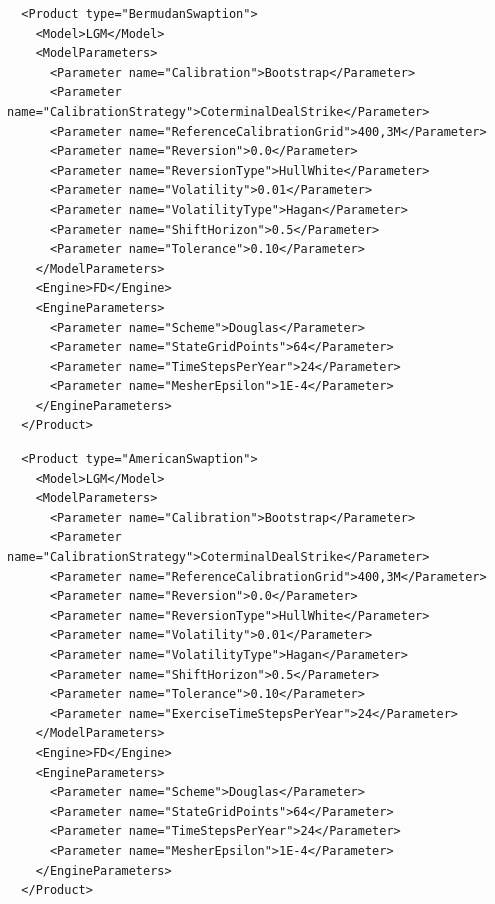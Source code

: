 \begin{listing}[h]
\begin{verbatim}
  <Product type="BermudanSwaption">
    <Model>LGM</Model>
    <ModelParameters>
      <Parameter name="Calibration">Bootstrap</Parameter>
      <Parameter name="CalibrationStrategy">CoterminalDealStrike</Parameter>
      <Parameter name="ReferenceCalibrationGrid">400,3M</Parameter>
      <Parameter name="Reversion">0.0</Parameter>
      <Parameter name="ReversionType">HullWhite</Parameter>
      <Parameter name="Volatility">0.01</Parameter>
      <Parameter name="VolatilityType">Hagan</Parameter>
      <Parameter name="ShiftHorizon">0.5</Parameter>
      <Parameter name="Tolerance">0.10</Parameter>
    </ModelParameters>
    <Engine>FD</Engine>
    <EngineParameters>
      <Parameter name="Scheme">Douglas</Parameter>
      <Parameter name="StateGridPoints">64</Parameter>
      <Parameter name="TimeStepsPerYear">24</Parameter>
      <Parameter name="MesherEpsilon">1E-4</Parameter>
    </EngineParameters>
  </Product>
\end{verbatim}
\caption{Bermudan Swaption pricing configuration FD Engine}
\label{lst:ir_bermswaption_pricing_config_fd}
\end{listing}

\begin{listing}[h]
\begin{verbatim}
  <Product type="AmericanSwaption">
    <Model>LGM</Model>
    <ModelParameters>
      <Parameter name="Calibration">Bootstrap</Parameter>
      <Parameter name="CalibrationStrategy">CoterminalDealStrike</Parameter>
      <Parameter name="ReferenceCalibrationGrid">400,3M</Parameter>
      <Parameter name="Reversion">0.0</Parameter>
      <Parameter name="ReversionType">HullWhite</Parameter>
      <Parameter name="Volatility">0.01</Parameter>
      <Parameter name="VolatilityType">Hagan</Parameter>
      <Parameter name="ShiftHorizon">0.5</Parameter>
      <Parameter name="Tolerance">0.10</Parameter>
      <Parameter name="ExerciseTimeStepsPerYear">24</Parameter>
    </ModelParameters>
    <Engine>FD</Engine>
    <EngineParameters>
      <Parameter name="Scheme">Douglas</Parameter>
      <Parameter name="StateGridPoints">64</Parameter>
      <Parameter name="TimeStepsPerYear">24</Parameter>
      <Parameter name="MesherEpsilon">1E-4</Parameter>
    </EngineParameters>
  </Product>
\end{verbatim}
\caption{American Swaption pricing configuration FD Engine}
\label{lst:ir_amswaption_pricing_config_fd}
\end{listing}

